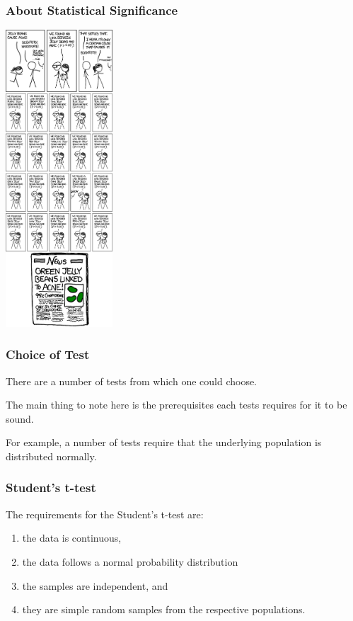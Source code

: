 \begin{frame}
\frametitle{About Statistical Significance}
\begin{changemargin}{1cm}

\begin{center}
\includegraphics[width=0.3\textwidth]{images/significant.png}
\end{center}

\end{changemargin}
\end{frame}

\begin{frame}
\frametitle{Choice of Test}
\begin{changemargin}{1cm}

There are a number of tests from
which one could choose. 

The main thing to note here is the
prerequisites each tests requires for it to be sound.

For example, a number of tests require that the underlying
population is distributed normally.

\end{changemargin}
\end{frame}

\begin{frame}
\frametitle{Student's t-test}
\begin{changemargin}{1cm}

The requirements for the Student's t-test are: 
\begin{enumerate}
	\item the data is continuous, 
	\item the data follows a normal probability distribution
	\item the samples are independent, and
	\item they are simple random samples from the respective populations.
\end{enumerate}
\end{changemargin}
\end{frame}

